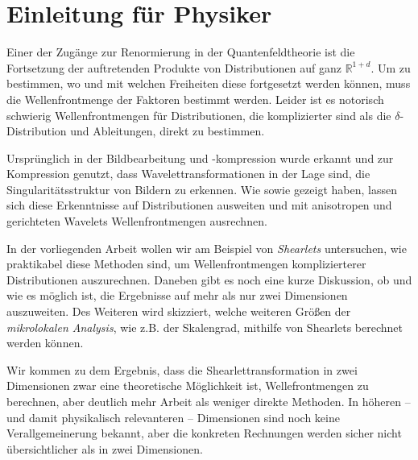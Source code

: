 
\section{Einleitung für Physiker} %
\label{sec:einleitung_physics}
Einer der Zugänge zur Renormierung in der Quantenfeldtheorie ist die Fortsetzung der auftretenden Produkte von Distributionen auf ganz $\mathbb{R}^{1+d}$. Um zu bestimmen, wo und mit welchen Freiheiten diese fortgesetzt werden können, muss die Wellenfrontmenge der Faktoren bestimmt werden. Leider ist es notorisch schwierig Wellenfrontmengen für Distributionen, die komplizierter sind als die $\delta$-Distribution und Ableitungen, direkt zu bestimmen.

Ursprünglich in der Bildbearbeitung und -kompression wurde erkannt und zur Kompression genutzt, dass Wavelettransformationen in der Lage sind, die Singularitätsstruktur von Bildern zu erkennen.
Wie \textcite {Kutyniok2008} sowie \textcite
{Candes2005} gezeigt haben, lassen sich diese Erkenntnisse auf Distributionen ausweiten und mit anisotropen und gerichteten Wavelets Wellenfrontmengen ausrechnen.

In der vorliegenden Arbeit wollen wir am Beispiel von \emph{Shearlets} untersuchen, wie praktikabel diese Methoden sind, um Wellenfrontmengen komplizierterer Distributionen auszurechnen. Daneben gibt es noch eine kurze Diskussion, ob und wie es möglich ist, die Ergebnisse auf mehr als nur zwei Dimensionen auszuweiten.
Des Weiteren wird skizziert, welche weiteren Größen der \emph{mikrolokalen Analysis}, wie z.B. der Skalengrad, mithilfe von Shearlets berechnet werden können.

Wir kommen zu dem Ergebnis, dass die Shearlettransformation in zwei Dimensionen zwar eine theoretische Möglichkeit ist, Wellefrontmengen zu berechnen, aber deutlich mehr Arbeit als weniger direkte Methoden. In höheren -- und damit physikalisch relevanteren -- Dimensionen sind noch keine Verallgemeinerung bekannt, aber die konkreten Rechnungen werden sicher nicht übersichtlicher als in zwei Dimensionen.


